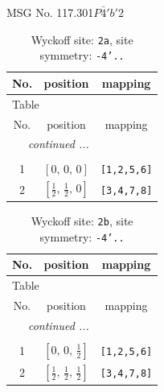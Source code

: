 \documentclass[fleqn,8pt]{jsarticle}
\begin{document}
\setcounter{MaxMatrixCols}{32}

\renewcommand{\tablename}{Table~}
\renewcommand{\figurename}{Figure~}
\begin{center}
\LARGE
MSG No. 117.301\quad$P\bar{4}'b'2$
\end{center}
\renewcommand{\arraystretch}{1.2}
\begin{longtable}{ccc}
\caption{Wyckoff site: {\tt 2a}, site symmetry: {\tt -4'..}}
 \\
 \hline \hline
No. & position & mapping \\ \hline \endfirsthead

\multicolumn{2}{l}{\tablename\ \thetable{}} \\
 \hline \hline
No. & position & mapping \\ \hline \endhead

 \hline \hline
\multicolumn{2}{r}{\footnotesize\it continued ...} \\ \endfoot

 \hline \hline
\multicolumn{2}{r}{} \\ \endlastfoot

1 & $\left[ 0,\, 0,\, 0 \right]$ & {\tt [1,2,5,6]} \\ \hline
2 & $\left[ \frac{1}{2},\, \frac{1}{2},\, 0 \right]$ & {\tt [3,4,7,8]} \\
\end{longtable}
\renewcommand{\arraystretch}{1.2}
\begin{longtable}{ccc}
\caption{Wyckoff site: {\tt 2b}, site symmetry: {\tt -4'..}}
 \\
 \hline \hline
No. & position & mapping \\ \hline \endfirsthead

\multicolumn{2}{l}{\tablename\ \thetable{}} \\
 \hline \hline
No. & position & mapping \\ \hline \endhead

 \hline \hline
\multicolumn{2}{r}{\footnotesize\it continued ...} \\ \endfoot

 \hline \hline
\multicolumn{2}{r}{} \\ \endlastfoot

1 & $\left[ 0,\, 0,\, \frac{1}{2} \right]$ & {\tt [1,2,5,6]} \\ \hline
2 & $\left[ \frac{1}{2},\, \frac{1}{2},\, \frac{1}{2} \right]$ & {\tt [3,4,7,8]} \\
\end{longtable}
\end{document}
